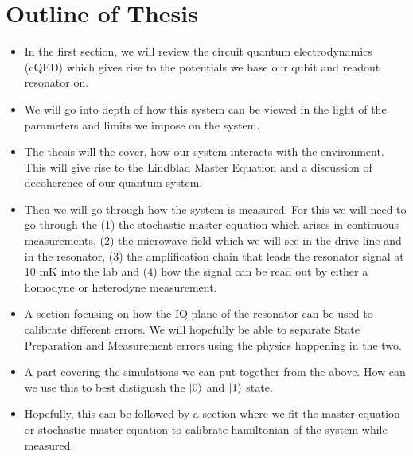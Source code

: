
\newpage
\section{Outline of Thesis}
\begin{itemize}
    \item In the first section, we will review the circuit quantum electrodynamics (cQED) which gives rise to the potentials we base our qubit and readout resonator on.
    \item We will go into depth of how this system can be viewed in the light of the parameters and limits we impose on the system.
    \item The thesis will the cover, how our system interacts with the environment. This will give rise to the Lindblad Master Equation and a discussion of decoherence of our quantum system. 
    \item Then we will go through how the system is measured. For this we will need to go through the (1) the stochastic master equation which arises in continuous measurements, (2) the microwave field which we will see in the drive line and in the resonator, (3) the amplification chain that leads the resonator signal at 10 mK into the lab and (4) how the signal can be read out by either a homodyne or heterodyne measurement.
    \item A section focusing on how the IQ plane of the resonator can be used to calibrate different errors. We will hopefully be able to separate State Preparation and Measurement errors using the physics happening in the two.
    \item A part covering the simulations we can put together from the above. How can we use this to best distiguish the $\ket{0}$ and $\ket{1}$ state. 
    \item Hopefully, this can be followed by a section where we fit the master equation or stochastic master equation to calibrate hamiltonian of the system while measured.
\end{itemize}


